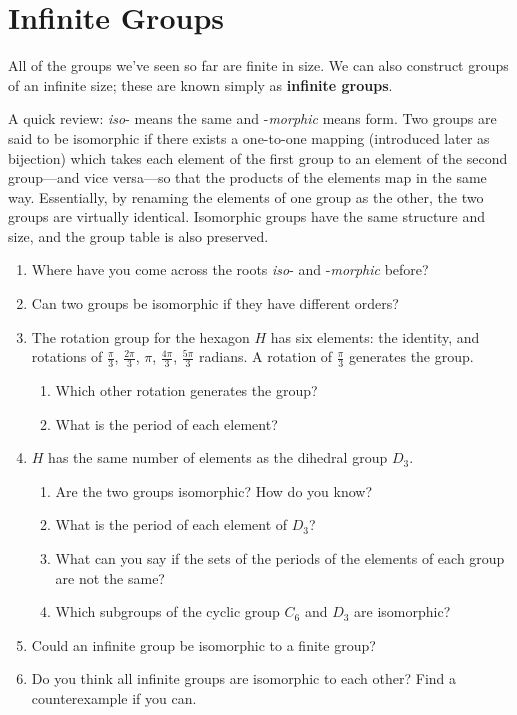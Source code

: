 \documentclass[../gatm.tex]{subfiles}
\begin{document}
\section{Infinite Groups}


All of the groups we've seen so far are finite in size. We can also construct groups of an infinite size; these are known simply as \textbf{infinite groups}.

A quick review: \textit{iso}- means the same and -\textit{morphic} means form. Two groups are said to be isomorphic if there exists a one-to-one mapping (introduced later as bijection) which takes each element of the first group to an element of the second group---and vice versa---so that the products of the elements map in the same way. Essentially, by renaming the elements of one group as the other, the two groups are virtually identical. Isomorphic groups have the same structure and size, and the group table is also preserved.

\begin{enumerate}
\item Where have you come across the roots \textit{iso}- and -\textit{morphic} before?
\item Can two groups be isomorphic if they have different orders?
\item The rotation group for the hexagon $H$ has six elements: the identity, and rotations of $\frac{\pi}{3}$, $\frac{2\pi}{3}$, $\pi$, $\frac{4\pi}{3}$, $\frac{5\pi}{3}$ radians. A rotation of $\frac{\pi}{3}$ generates the group.
\begin{enumerate}
\item Which other rotation generates the group?
\item What is the period of each element?
\end{enumerate}
\item $H$ has the same number of elements as the dihedral group $D_3$.
\begin{enumerate}
\item Are the two groups isomorphic? How do you know?
\item What is the period of each element of $D_3$?
\item What can you say if the sets of the periods of the elements of each group are not the same?
\item Which subgroups of the cyclic group $C_6$ and $D_3$ are isomorphic?
\end{enumerate}
\item Could an infinite group be isomorphic to a finite group?
\item Do you think all infinite groups are isomorphic to each other? Find a counterexample if you can.
\setcounter{inf_problem_i}{\value{enumi}}
\end{enumerate}
\end{document}
